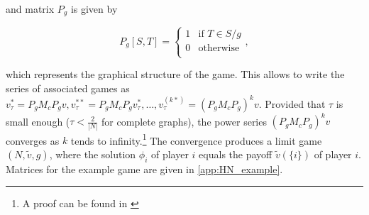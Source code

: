 and matrix $P_g$ is given by

\begin{equation}
	P_g[S, T] =
	\begin{cases}
		1 & \text{if } T \in S/g \\
		0 & \text{otherwise}     \\
	\end{cases}
	,
\end{equation}


which represents the graphical structure of the game. This allows to write the series of associated
games as $v^*_\tau = P_g M_c P_g v, v^{**}_\tau = P_g M_c P_g v^*_\tau, \dots, v^{(k*)}_\tau = \left(P_g M_c P_g\right)^k v$.
Provided that $\tau$ is small enough ($\tau < \frac{2}{|N|}$ for complete graphs\cite{hamiache2001associated}),
the power series $\left(P_g M_c P_g\right)^k v$ converges as $k$ tends to infinity.\footnote{A proof can be found in \cite{hamiache_associated_2020}}
The convergence produces a limit game $(N, \tilde{v}, g)$, where the solution $\phi_i$ of player $i$ equals the
payoff $\tilde{v}(\{i\})$ of player $i$.\cite{zhang2022gstarx, hamiache_associated_2020}
Matrices for the example game are given in \cref{app:HN_example}.


% 
